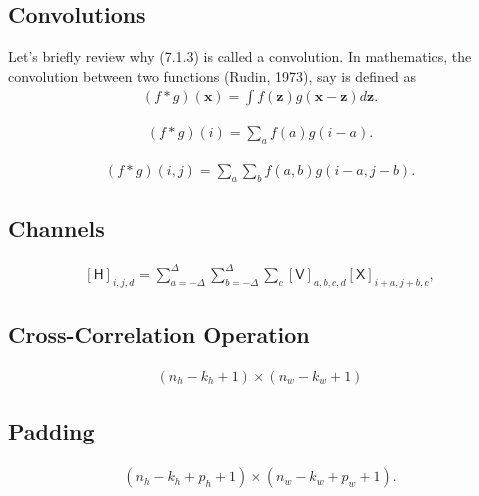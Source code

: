 \documentclass[a4paper,12pt]{article}
\theoremstyle{definition}
\begin{document}
    \subsection*{Convolutions}
    Let’s briefly review why (7.1.3) is called a convolution. In mathematics, the convolution between two functions (Rudin, 1973), say 
    is defined as
    \begin{equation*}
        \begin{aligned}
            (f * g)(\mathbf{x}) = \int f(\mathbf{z}) g(\mathbf{x}-\mathbf{z}) d\mathbf{z}.
        \end{aligned}
    \end{equation*}

    \begin{equation*}
        \begin{aligned}
            (f * g)(i) = \sum_a f(a) g(i-a).
        \end{aligned}
    \end{equation*}

    \begin{equation*}
        \begin{aligned}
            (f * g)(i, j) = \sum_a\sum_b f(a, b) g(i-a, j-b).
        \end{aligned}
    \end{equation*}

    \subsection*{Channels}
    \begin{equation*}
        \begin{aligned}
            [\mathsf{H}]_{i,j,d} = \sum_{a = -\Delta}^{\Delta} \sum_{b = -\Delta}^{\Delta} \sum_c [\mathsf{V}]_{a, b, c, d} [\mathsf{X}]_{i+a, j+b, c},
        \end{aligned}
    \end{equation*}

    \subsection*{Cross-Correlation Operation}
    \begin{equation*}
        \begin{aligned}
            (n_h-k_h+1) \times (n_w-k_w+1)
        \end{aligned}
    \end{equation*}

    \subsection*{Padding}
    \begin{equation*}
        \begin{aligned}
            (n_h-k_h+p_h+1)\times(n_w-k_w+p_w+1).
        \end{aligned}
    \end{equation*}
\end{document}
